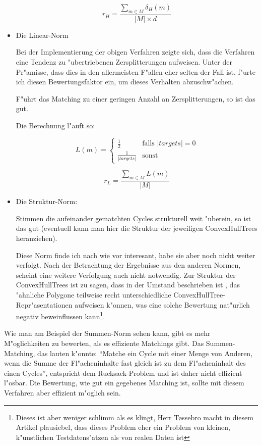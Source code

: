 \begin{itemize}
$$r_H=\frac{\sum_{m\in M}\delta_H(m)}{|M|\times d}$$


\item Die Linear-Norm

Bei der Implementierung der obigen Verfahren zeigte sich, dass die Verfahren eine Tendenz zu "ubertriebenen Zersplitterungen aufweisen. Unter der Pr"amisse, dass dies in den allermeisten F"allen eher selten der Fall ist, f"urte ich diesen Bewertungsfaktor ein, um dieses Verhalten abzuschw"achen.

F"uhrt das Matching zu einer geringen Anzahl an Zersplitterungen, so ist das gut.

Die Berechnung l"auft so:




$$L(m)=
\begin{cases}
	\frac{1}{2} & \text{falls }|targets|=0\\
	\frac{1}{|targets|} & \text{sonst}
    \end{cases}
$$

$$r_L=\frac{\sum_{m\in M}L(m)}{|M|}$$

\item Die Struktur-Norm:

Stimmen die aufeinander gematchten Cycles strukturell weit "uberein, so ist das gut (eventuell kann man hier die Struktur der jeweiligen ConvexHullTrees heranziehen).

Diese Norm finde ich nach wie vor interesant, habe sie aber noch nicht weiter verfolgt. Nach der Betrachtung der Ergebnisse aus den anderen Normen, scheint eine weitere Verfolgung auch nicht notwendig. Zur Struktur der ConvexHullTrees ist zu sagen, dass in \cite{TG} der Umstand beschrieben ist , das "ahnliche Polygone teilweise recht unterschiedliche ConvexHullTree-Repr"asentationen aufweisen k"onnen, was eine solche Bewertung nat"urlich negativ beweinflussen kann\footnote{Dieses ist aber weniger schlimm als es klingt, Herr T\o{}ssebro macht in diesem Artikel plausiebel, dass dieses Problem eher ein Problem von kleinen, k"unstlichen Testdatens"atzen als von realen Daten ist}.


\end{itemize} 

Wie man am Beispiel der Summen-Norm sehen kann, gibt es mehr M"oglichkeiten zu bewerten, als es effiziente Matchings gibt. Das Summen-Matching, das lauten k"onnte: "`Matche ein Cycle mit  einer Menge von Anderen, wenn die Summe der Fl"acheninhalte fast gleich ist zu dem Fl"acheninhalt des einen Cycles"', entspricht dem Rucksack-Problem und ist daher nicht effizient l"osbar. Die Bewertung, wie gut ein gegebenes Matching ist, sollte mit diesem Verfahren aber effizient m"oglich sein.


